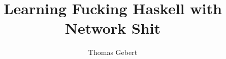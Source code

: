 \documentclass[a4paper,12pt]{book}
\begin{document}
\author{Thomas Gebert}
\title{Learning Fucking Haskell with Network Shit}

\maketitle
\tableofcontents

%


\end{document}
